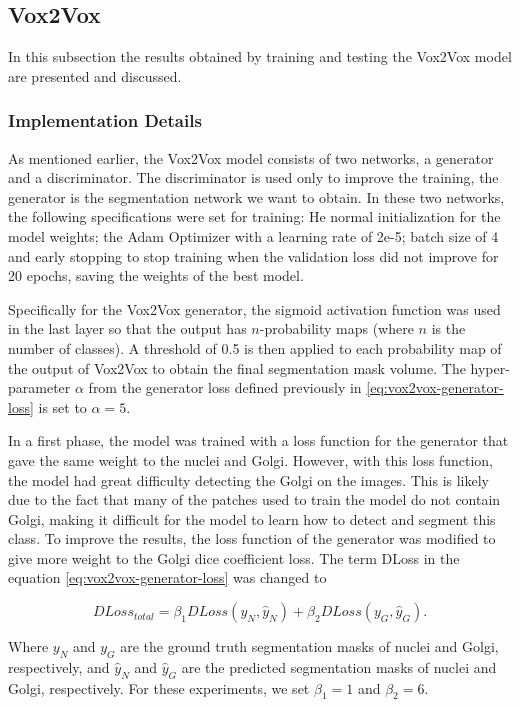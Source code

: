 \subsection{Vox2Vox}

In this subsection the results obtained by training and testing the Vox2Vox model are presented and discussed.

\subsubsection*{Implementation Details}

As mentioned earlier, the Vox2Vox model consists of two networks, a generator and a discriminator. The discriminator is used only to improve the training, the generator is the segmentation network we want to obtain. In these two networks, the following specifications were set for training: He normal initialization for the model weights; the Adam Optimizer with a learning rate of 2e-5; batch size of 4 and early stopping to stop training when the validation loss did not improve for 20 epochs, saving the weights of the best model.

Specifically for the Vox2Vox generator, the sigmoid activation function was used in the last layer so that the output has $n$-probability maps (where $n$ is the number of classes). A threshold of 0.5 is then applied to each probability map of the output of Vox2Vox to obtain the final segmentation mask volume. The hyper-parameter $\alpha$ from the generator loss defined previously in \ref{eq:vox2vox-generator-loss} is set to $\alpha = 5$.

In a first phase, the model was trained with a loss function for the generator that gave the same weight to the nuclei and Golgi. However, with this loss function, the model had great difficulty detecting the Golgi on the images. This is likely due to the fact that many of the patches used to train the model do not contain Golgi, making it difficult for the model to learn how to detect and segment this class. To improve the results, the loss function of the generator was modified to give more weight to the Golgi dice coefficient loss. The term \ac{DLoss} in the equation \ref{eq:vox2vox-generator-loss} was changed to

\begin{equation}
    DLoss_{total} = \beta_1 DLoss(y_N,\hat{y}_N) + \beta_2 DLoss(y_G,\hat{y}_G).
\end{equation}

Where $y_N$ and $y_G$ are the ground truth segmentation masks of nuclei and Golgi, respectively, and $\hat{y}_N$ and $\hat{y}_G$ are the predicted segmentation masks of nuclei and Golgi, respectively. For these experiments, we set $\beta_1 = 1$ and $\beta_2 = 6$.


